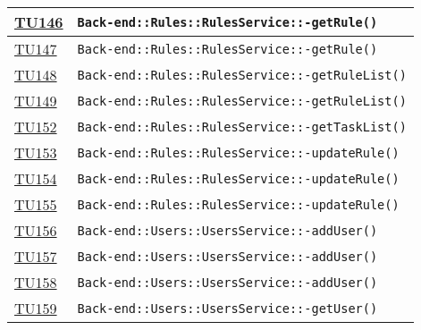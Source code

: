 \begin{longtable}{|>{\centering}m{1cm}|m{12cm}<{\centering}|}
\hyperlink{TU146}{TU146} & \texttt{Back-end::Rules::RulesService::-\linebreak getRule()}\\ \hline

\hyperlink{TU147}{TU147} & \texttt{Back-end::Rules::RulesService::-\linebreak getRule()}\\ \hline

\hyperlink{TU148}{TU148} & \texttt{Back-end::Rules::RulesService::-\linebreak getRuleList()}\\ \hline

\hyperlink{TU149}{TU149} & \texttt{Back-end::Rules::RulesService::-\linebreak getRuleList()}\\ \hline

\hyperlink{TU152}{TU152} & \texttt{Back-end::Rules::RulesService::-\linebreak getTaskList()}\\ \hline

\hyperlink{TU153}{TU153} & \texttt{Back-end::Rules::RulesService::-\linebreak updateRule()}\\ \hline

\hyperlink{TU154}{TU154} & \texttt{Back-end::Rules::RulesService::-\linebreak updateRule()}\\ \hline

\hyperlink{TU155}{TU155} & \texttt{Back-end::Rules::RulesService::-\linebreak updateRule()}\\ \hline

\hyperlink{TU156}{TU156} & \texttt{Back-end::Users::UsersService::-\linebreak addUser()}\\ \hline

\hyperlink{TU157}{TU157} & \texttt{Back-end::Users::UsersService::-\linebreak addUser()}\\ \hline

\hyperlink{TU158}{TU158} & \texttt{Back-end::Users::UsersService::-\linebreak addUser()}\\ \hline

\hyperlink{TU159}{TU159} & \texttt{Back-end::Users::UsersService::-\linebreak getUser()}\\ \hline


\end{longtable}
